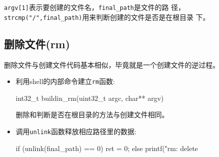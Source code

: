 \texttt{argv[1]}表示要创建的文件名，\texttt{final\_path}是文件的路
径，\texttt{strcmp("/",final\_path)}用来判断创建的文件是否是在根目录
下。

\subsection{删除文件(rm)}

删除文件与创建文件代码基本相似，毕竟就是一个创建文件的逆过程。
\begin{itemize}
\item 利用shell的内部命令建立\texttt{rm}函数:
\begin{ccode}
   int32_t buildin_rm(uint32_t argc, char** argv)
\end{ccode}
删除和判断是否在根目录的方法与创建文件相同。
\item 调用\texttt{unlink}函数释放相应路径里的数据:
\begin{ccode}
   if (unlink(final_path) == 0)
   {
      ret = 0;
   } else {
     printf("rm: delete %
   }
\end{ccode}
\end{itemize}
